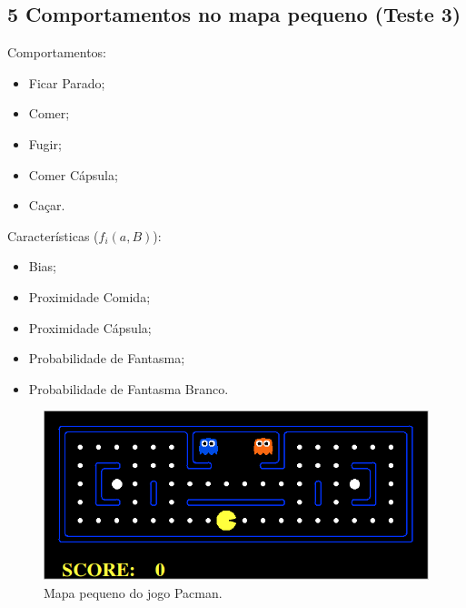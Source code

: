\documentclass{beamer}
\begin{document}

\subsection{5 Comportamentos no mapa pequeno (Teste 3)}

\begin{frame}
\begin{multicols}{2}
Comportamentos:
\begin{itemize}
	\item Ficar Parado;
	\item Comer;
	\item Fugir;
	\item Comer Cápsula;
	\item Caçar.
\end{itemize}
\vfill
\columnbreak

Características ($ f_i \left( a, B \right) $):
\begin{itemize}
	\item Bias;
	\item Proximidade Comida;
	\item Proximidade Cápsula;
	\item Probabilidade de Fantasma;
	\item Probabilidade de Fantasma Branco.
\end{itemize}

\end{multicols}

\begin{figure}[h]
    \centering
    \includegraphics[width=0.6\linewidth]{images/pacman_small_map}
    \caption{Mapa pequeno do jogo Pacman.}
\end{figure}
\end{frame}

\end{document}
